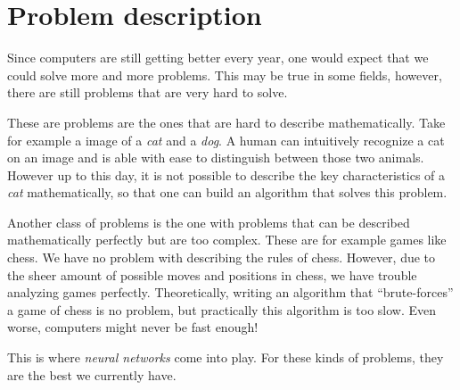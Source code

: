\section{Problem description}
\label{sec:problem-description}

Since computers are still getting better every year, one would expect that we could solve more and more problems.
This may be true in some fields, however, there are still problems that are very hard to solve.

These are problems are the ones that are hard to describe mathematically.
Take for example a image of a \emph{cat} and a \emph{dog}.
A human can intuitively recognize a cat on an image and is able with ease to distinguish between those two animals.
However up to this day, it is not possible to describe the key characteristics of a \emph{cat} mathematically,
so that one can build an algorithm that solves this problem.

Another class of problems is the one with problems that can be described mathematically perfectly but are too complex.
These are for example games like chess.
We have no problem with describing the rules of chess.
However, due to the sheer amount of possible moves and positions in chess, we have trouble analyzing games perfectly.
Theoretically, writing an algorithm that \enquote{brute-forces} a game of chess is no problem, but practically this algorithm is too slow.
Even worse, computers might never be fast enough!

This is where \emph{neural networks} come into play.
For these kinds of problems, they are the best we currently have.